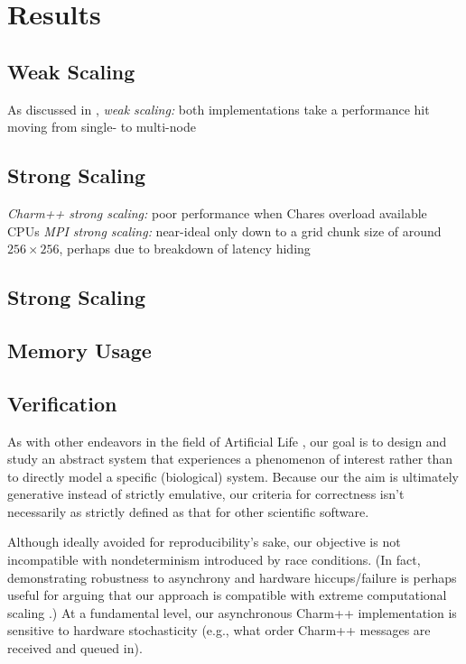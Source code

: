 \section{Results}

\subsection{Weak Scaling}




As discussed in \label{sec:compute},
\textit{weak scaling:} both implementations take a performance hit moving from single- to multi-node


\subsection{Strong Scaling}




\textit{Charm++ strong scaling:} poor performance when Chares overload available CPUs
\textit{MPI strong scaling:} near-ideal only down to a grid chunk size of around $256\times256$, perhaps due to breakdown of latency hiding

\subsection{Strong Scaling}

\subsection{Memory Usage}

\subsection{Verification}



As with other endeavors in the field of Artificial Life \cite{bedau2000open}, our goal is to design and study an abstract system that experiences a phenomenon of interest rather than to directly model a specific (biological) system.
Because our the aim is ultimately generative instead of strictly emulative, our criteria for correctness isn't necessarily as strictly defined as that for other scientific software.

Although ideally avoided for reproducibility's sake, our objective is not incompatible with nondeterminism introduced by race conditions.
(In fact, demonstrating robustness to asynchrony and hardware hiccups/failure is perhaps useful for arguing that our approach is compatible with extreme computational scaling \cite{ackley2016indefinite}.)
At a fundamental level, our asynchronous Charm++ implementation is sensitive to hardware stochasticity (e.g., what order Charm++ messages are received and queued in).

